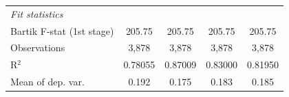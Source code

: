 \begin{tabular}{lcccc}
   \midrule
   \emph{Fit statistics}\\
   Bartik F-stat (1st stage)                                     & 205.75                              & 205.75                           & 205.75                              & 205.75\\  
   Observations                                                          & 3,878                               & 3,878                            & 3,878                               & 3,878\\  
   R$^2$                                                                 & 0.78055                             & 0.87009                          & 0.83000                             & 0.81950\\  
   Mean of dep. var.                                                     & 0.192                               & 0.175                            & 0.183                               & 0.185\\  
\bottomrule
\end{tabular}
